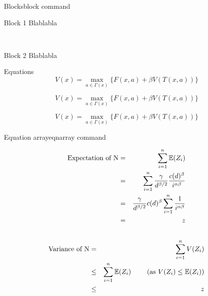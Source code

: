 \begin{frame}{Blocks}{block command}
    \begin{block}{Block 1}
        Blablabla
    \end{block}

    ~\\

    \begin{block}{Block 2}
        Blablabla
    \end{block}
\end{frame}
\note{
}


\begin{frame}{Equations}
    $$
        V(x) = \max_{a \in \Gamma (x) } \{ F(x,a) + \beta V(T(x,a)) \}  \label{eq:bellman2}
    $$

    \[
        V(x) = \max_{a \in \Gamma (x) } \{ F(x,a) + \beta V(T(x,a)) \}  \label{eq:bellman3}
    \]

    \begin{equation}
        V(x) = \max_{a \in \Gamma (x) } \{ F(x,a) + \beta V(T(x,a)) \}  \label{eq:bellman4}
    \end{equation}
\end{frame}
\note{
}



\begin{frame}{Equation array}{eqnarray command}
    \begin{tiny}
        \begin{eqnarray*}
            \mbox{Expectation of N} & = & \sum_{i=1}^{n} \mathbb{E}(Z_i) \\
                                    & = & \sum_{i=1}^{n} \frac{\gamma}{d^{\beta/2}} \frac{ c(d)^\beta }{i^{\alpha\beta}} \\
                                    & = & \frac{\gamma}{d^{\beta/2}} c(d)^\beta \sum_{i=1}^{n} \frac{1}{i^{\alpha\beta}} \\
                                    & = & z \\
                                    & ~ & \\
        \end{eqnarray*}
        \begin{eqnarray}
            \mbox{Variance of N} & = & \sum_{i=1}^{n} V(Z_i) \\
                                 & \leq & \sum_{i=1}^{n} \mathbb{E}(Z_i) ~~~~~~~ (\mbox{as } V(Z_i) \leq \mathbb{E}(Z_i)) \\
                                 & \leq & z  \nonumber
        \end{eqnarray}
    \end{tiny}
\end{frame}
\note{
}



